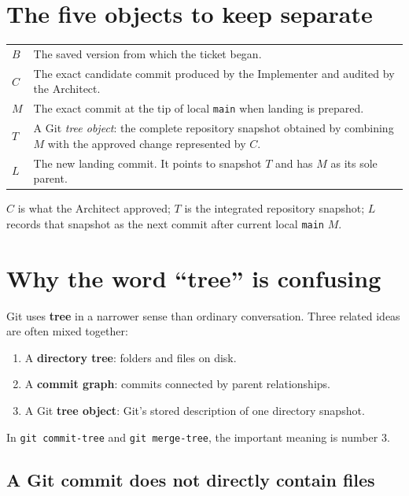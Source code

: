 \documentclass[10pt,twocolumn]{article}
\newcommand{\code}[1]{\texttt{#1}}
\newcommand{\term}[1]{\textbf{#1}}
\begin{document}
\section{The five objects to keep separate}

\begin{tabularx}{\columnwidth}{>{\bfseries}p{} X}
$B$ & The saved version from which the ticket began.\\
$C$ & The exact candidate commit produced by the Implementer and audited by the Architect.\\
$M$ & The exact commit at the tip of local \code{main} when landing is prepared.\\
$T$ & A Git \emph{tree object}: the complete repository snapshot obtained by combining $M$ with the approved change represented by $C$.\\
$L$ & The new landing commit. It points to snapshot $T$ and has $M$ as its sole parent.\\
\end{tabularx}

\begin{keybox}
$C$ is what the Architect approved; $T$ is the integrated repository
snapshot; $L$ records that snapshot as the next commit after current local
\code{main} $M$.
\end{keybox}

\section{Why the word ``tree'' is confusing}

Git uses \term{tree} in a narrower sense than ordinary conversation. Three
related ideas are often mixed together:

\begin{enumerate}
  \item A \term{directory tree}: folders and files on disk.
  \item A \term{commit graph}: commits connected by parent relationships.
  \item A Git \term{tree object}: Git's stored description of one directory snapshot.
\end{enumerate}

In \code{git commit-tree} and \code{git merge-tree}, the important meaning is
number 3.

\subsection{A Git commit does not directly contain files}
\end{document}
